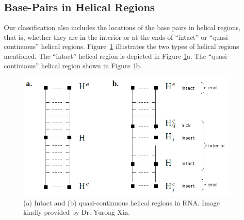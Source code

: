 \subsection{Base-Pairs in Helical Regions}
Our classification also includes the locations of the base pairs in helical
regions, that is,  whether they are in the interior or  at the ends of
``intact'' or ``quasi-continuous'' helical
regions.  Figure~\ref{fig:helregxin}  illustrates  the  two  types  of
helical regions  mentioned. The ``intact'' helical region
is depicted in Figure \ref{fig:helregxin}a.
The ``quasi-continuous'' helical region shown in Figure \ref{fig:helregxin}b.

\begin{figure}
\centering
\includegraphics[scale=0.4]{Chapter3/helcontext.png}
\caption{(a)  Intact  and  (b)  quasi-continuous  helical  regions  in
  RNA. Image kindly provided by Dr. Yurong Xin.}
\label{fig:helregxin}
\end{figure}  

